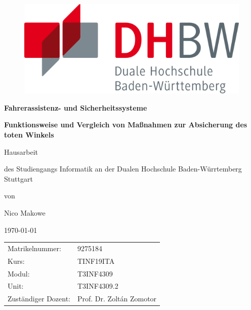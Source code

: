 \begin{titlepage}
		\begin{figure}
			\raggedleft
			\includegraphics[width=0.4\linewidth]{images/shared/DHBW-Logo}
			\label{fig:dhbw-logo}
		\end{figure}
	\begin{center}
		\LARGE
		\vspace*{0.5cm}
		\textbf{Fahrerassistenz- und Sicherheitssysteme}
		
		\vspace{1cm}
		
		\textbf{Funktionsweise und Vergleich von Maßnahmen zur Absicherung des toten Winkels}
		
		\vspace{1cm}
		\Large
		Hausarbeit
	
		\large
		\vspace{1cm}
		des Studiengangs Informatik an der Dualen Hochschule Baden-Würrtemberg Stuttgart
		
		\vspace{1cm}
		von
		
		\Large
		\vspace{1cm}
		Nico Makowe
		
		\vspace{1cm}
		\dateGerman\today
		
		\vfill
		\large
		\begin{tabular}{l l}
			Matrikelnummer: & 9275184 \\
			Kurs: & TINF19ITA \\
			Modul: & T3INF4309 \\
			Unit: & T3INF4309.2 \\
			Zuständiger Dozent: & Prof. Dr. Zoltán Zomotor
		\end{tabular}
		
	\end{center}

\end{titlepage}